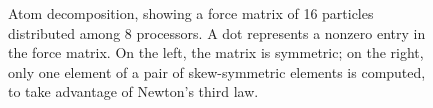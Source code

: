 \begin{figure}[htbp]
\begin{center}
\caption{Atom decomposition, showing a force matrix of 16 particles
distributed among 8 processors.  A dot represents a nonzero entry in
the force matrix.
On the left, the matrix is symmetric; on the right, only one element of a pair
of skew-symmetric elements is computed, to take advantage of Newton's third law.} 
\label{fig:atom} 
\end{center} 
\end{figure}


